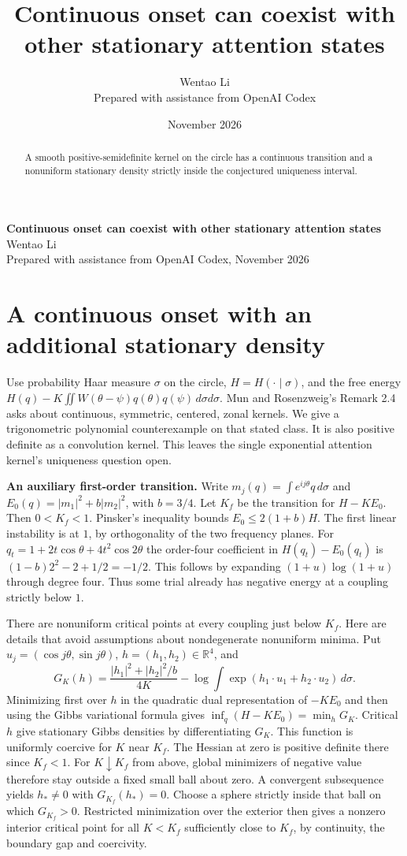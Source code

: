 \documentclass[11pt]{article}
\title{Continuous onset can coexist with other stationary attention states}
\author{Wentao Li\\{\small Prepared with assistance from OpenAI Codex}}
\date{November 2026}
\begin{document}
\begin{center}{\Large\bfseries Continuous onset can coexist with other stationary attention states}\\[3pt]Wentao Li\\{\small Prepared with assistance from OpenAI Codex, November 2026}\end{center}
\begin{abstract}
A smooth positive-semidefinite kernel on the circle has a continuous transition and a nonuniform stationary density strictly inside the conjectured uniqueness interval.
\end{abstract}
\section*{A continuous onset with an additional stationary density}
Use probability Haar measure $\sigma$ on the circle, $H=H(\cdot\mid\sigma)$, and the free energy $H(q)-K\iint W(\theta-\psi)q(\theta)q(\psi)\,d\sigma d\sigma$. Mun and Rosenzweig's Remark 2.4 asks about continuous, symmetric, centered, zonal kernels. We give a trigonometric polynomial counterexample on that stated class. It is also positive definite as a convolution kernel. This leaves the single exponential attention kernel's uniqueness question open.

\textbf{An auxiliary first-order transition.} Write $m_j(q)=\int e^{ij\theta}q\,d\sigma$ and $E_0(q)=|m_1|^2+b|m_2|^2$, with $b=3/4$. Let $K_f$ be the transition for $H-KE_0$. Then $0<K_f<1$. Pinsker's inequality bounds $E_0\le 2(1+b)H$. The first linear instability is at $1$, by orthogonality of the two frequency planes. For $q_t=1+2t\cos\theta+4t^2\cos2\theta$ the order-four coefficient in $H(q_t)-E_0(q_t)$ is $(1-b)2^2-2+1/2=-1/2$. This follows by expanding $(1+u)\log(1+u)$ through degree four. Thus some trial already has negative energy at a coupling strictly below $1$.

There are nonuniform critical points at every coupling just below $K_f$. Here are details that avoid assumptions about nondegenerate nonuniform minima. Put $u_j=(\cos j\theta,\sin j\theta)$, $h=(h_1,h_2)\in\mathbb R^4$, and
\[
 G_K(h)=\frac{|h_1|^2+|h_2|^2/b}{4K}
       -\log\int \exp(h_1\cdot u_1+h_2\cdot u_2)\,d\sigma.
\]
Minimizing first over $h$ in the quadratic dual representation of $-KE_0$ and then using the Gibbs variational formula gives $\inf_q(H-KE_0)=\min_hG_K$. Critical $h$ give stationary Gibbs densities by differentiating $G_K$. This function is uniformly coercive for $K$ near $K_f$. The Hessian at zero is positive definite there since $K_f<1$. For $K\downarrow K_f$ from above, global minimizers of negative value therefore stay outside a fixed small ball about zero. A convergent subsequence yields $h_*\ne0$ with $G_{K_f}(h_*)=0$. Choose a sphere strictly inside that ball on which $G_{K_f}>0$. Restricted minimization over the exterior then gives a nonzero interior critical point for all $K<K_f$ sufficiently close to $K_f$, by continuity, the boundary gap and coercivity.
\end{document}
